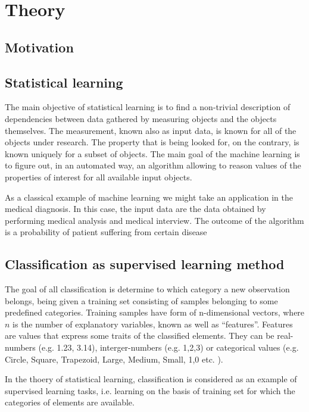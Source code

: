 \chapter{Theory}
\section{Motivation}
\section{Statistical learning}
The main objective of statistical learning is to find a non-trivial description of dependencies between data gathered by measuring objects and the objects themselves. The measurement, known also as input data, is known for all of the objects under research. The property that is being looked for, on the contrary, is known uniquely for a subset of objects. The main goal of the machine learning is to figure out, in an automated way, an algorithm allowing to reason values of the properties of interest for all available input objects.

As a classical example of machine learning we might take an application in the medical diagnosis. In this case, the input data are the data obtained by performing medical analysis and medical interview. The outcome of the algorithm is a probability of patient suffering from certain disease
\section{Classification as supervised learning method}
The goal of all classification is determine to which category a new observation belongs, being given a training set consisting of samples belonging to some predefined categories. Training samples have form of n-dimensional vectors, where $n$ is the number of explanatory variables, known as well as ``features''. Features are values that express some traits of the classified elements. They can be real-numbers (e.g. 1.23, 3.14), interger-numbers (e.g. 1,2,3) or categorical values (e.g. {Circle, Square, Trapezoid}, {Large, Medium, Small}, {1,0} etc. ).

In the thoery of statistical learning, classification is considered as an example of supervised learning tasks, i.e. learning on the basis of training set for which the categories of elements are available.


